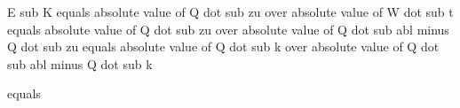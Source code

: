E sub K equals absolute value of Q dot sub zu over absolute value of W dot sub t equals absolute value of Q dot sub zu over absolute value of Q dot sub abl minus Q dot sub zu equals absolute value of Q dot sub k over absolute value of Q dot sub abl minus Q dot sub k

equals
